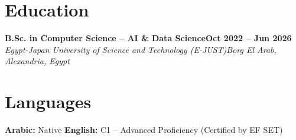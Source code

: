 \documentclass[11pt,a4paper]{article}
\newcommand{\role}[4]{%
  \vspace{1pt}%
  \noindent\textbf{#1}\hfill\textbf{#2}\\[0.5pt]%
  \textit{#3}\hfill\textit{#4}\par\vspace{1pt}%
}
\begin{document}
\section{Education}
\role{B.Sc. in Computer Science -- AI \& Data Science}{Oct 2022 -- Jun 2026}{Egypt-Japan University of Science and Technology (E-JUST)}{Borg El Arab, Alexandria, Egypt}

\section{Languages}
\noindent
\textbf{Arabic:} Native \quad\textbar\quad
\textbf{English:} C1 -- Advanced Proficiency (Certified by EF SET)
\end{document}
